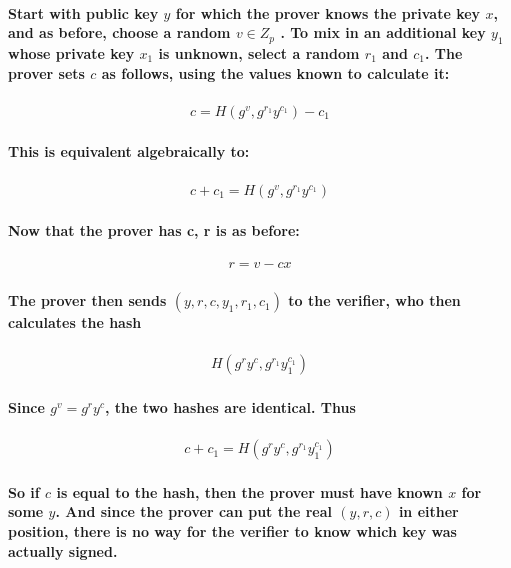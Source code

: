\documentclass{article}
\begin{document}
\paragraph{Start with public key $y$ for which the prover knows the private key $x$, and as before, choose a random $v \in Z_p$ . To mix in an additional key $y_1$ whose private key $x_1$ is unknown, select a random $r_1$ and $c_1$.  The prover sets $c$ as follows, using the values known to calculate it:}

\begin{eqnarray}
  c = H(g^v, g^{r_1} y^{c_1}) - c_1
\end{eqnarray}

\paragraph{This is equivalent algebraically to:}

\begin{eqnarray}
  c + c_1 = H(g^v, g^{r_1} y^{c_1})
\end{eqnarray}

\paragraph{Now that the prover has c, r is as before:}

\begin{eqnarray}
  r = v - cx
\end{eqnarray}

\paragraph{The prover then sends $(y, r, c, y_1, r_1, c_1)$ to the verifier, who then calculates the hash}

\begin{eqnarray}
  H(g^r y^c, g^{r_1} y_1^{c_1})
\end{eqnarray}

\paragraph{Since $g^v = g^r y^c$, the two hashes are identical.  Thus }

\begin{eqnarray}
  c + c_1 = H(g^r y^c, g^{r_1} y_1^{c_1})
\end{eqnarray}

\paragraph{So if $c$ is equal to the hash, then the prover must have known $x$ for some $y$.  And since the prover can put the real $(y,r,c)$ in either position, there is no way for the verifier to know which key was actually signed.}
\end{document}
